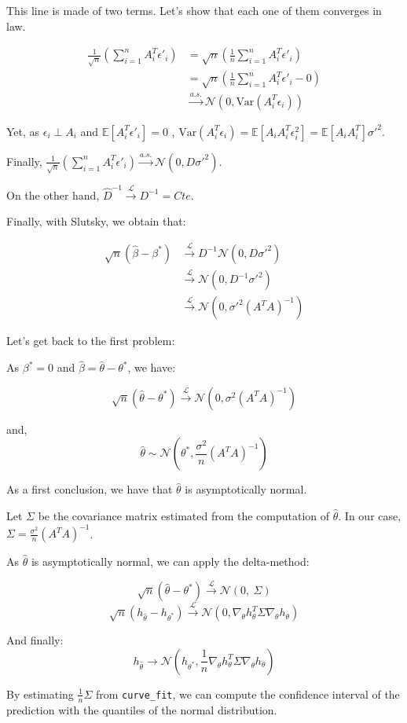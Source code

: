 \documentclass{article}
\begin{document}
This line is made of two terms. Let's show that each one of them converges in law. 

\begin{align*}
    \frac{1}{\sqrt{n}} \left( \sum_{i=1}^{n}  A_i^T \epsilon'_i \right) &= \sqrt{n} \left( \frac{1}{n} \sum_{i=1}^{n}  A_i^T \epsilon'_i \right) \\
    &= \sqrt{n} \left( \frac{1}{n} \sum_{i=1}^{n}  A_i^T \epsilon'_i - 0 \right) \\
    &\xrightarrow{a.s.} \mathcal{N}(0, \text{Var}(A_i^T \epsilon_i) )
\end{align*}

Yet, as $\epsilon_i \perp A_i $ and $\mathbb{E} [ A_i^T \epsilon'_i] = 0 $ , $\text{Var}(A_i^T \epsilon_i) = \mathbb{E}[A_i A_i ^T \epsilon_i ^2 ] = \mathbb{E} [ A_i A_i ^T ] \sigma'^2$. 

Finally, $\frac{1}{\sqrt{n}} \left( \sum_{i=1}^{n}  A_i^T \epsilon'_i \right) \xrightarrow{a.s.} \mathcal{N}(0, D \sigma'^{2})$. 

On the other hand, $\hat{D}^{-1} \xrightarrow{\mathcal{L}} D^{-1} = Cte $.

Finally, with Slutsky, we obtain that: 

\begin{align*}
    \sqrt{n} (\hat{\beta} - \beta^*) &\xrightarrow{\mathcal{L}} D^{-1}\mathcal{N}(0, D \sigma'^2) \\
    &\xrightarrow{\mathcal{L}} \mathcal{N}(0, D^{-1} \sigma'^2) \\
    &\xrightarrow{\mathcal{L}} \mathcal{N}(0, \sigma'^2 (A^T A)^{-1})
\end{align*}

Let's get back to the first problem: 

As $\beta ^* = 0 $ and $\hat{\beta} = \hat{\theta} - \theta ^* $, we have: 

\[
\sqrt{n} (\hat{\theta} - \theta^*) \xrightarrow{\mathcal{L}} \mathcal{N}(0, \sigma^2 (A^T A)^{-1})
\]

and, 
\[
\hat{\theta} \sim \mathcal{N}(\theta^*, \frac{\sigma^2}{n} (A^T A)^{-1})
\]

As a first conclusion, we have that $\hat{\theta}$ is asymptotically normal.

Let $\Sigma$ be the covariance matrix estimated from the computation of $\hat{\theta}$. In our case, $\Sigma = \frac{\sigma^2}{n} (A^T A)^{-1}$. 

As $\hat{\theta}$ is asymptotically normal, we can apply the delta-method: 

\[
\sqrt{n} (\hat{\theta} -\theta^*) \xrightarrow{\mathcal{L}} \mathcal{N}(0, \ \Sigma)
\]
\[
\sqrt{n} (h_{\hat{\theta}} -h_{\theta^*}) \xrightarrow{\mathcal{L}} \mathcal{N}(0, \nabla_\theta h_\theta ^T \Sigma  \nabla_\theta h_\theta)
\]

And finally: 
\[
h_{\hat{\theta}} \rightarrow \mathcal{N}(h_{\theta^*}, \frac{1}{n}\nabla_\theta h_\theta ^T \Sigma  \nabla_\theta h_\theta)
\]

By estimating $\frac{1}{n} \Sigma$ from \texttt{curve\_fit}, we can compute the confidence interval of the prediction with the quantiles of the normal distribution.
\end{document}
